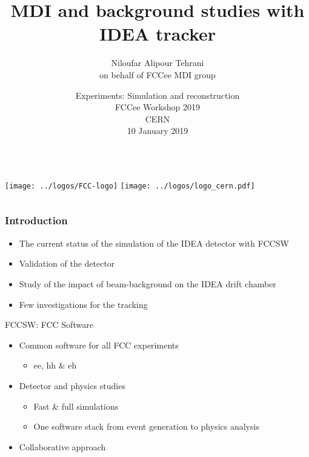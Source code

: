 \documentclass[aspectratio=169, hyperref={colorlinks=true,pdfpagelabels=false,linkcolor=black}, xcolor=dvipsnames,10pt]{beamer}
\title[]{MDI and background studies with IDEA tracker}
\author[Niloufar Alipour Tehrani]{Niloufar Alipour Tehrani \\
on behalf of FCCee MDI group}
\institute[CERN]{}
\date[10 April 2018]{Experiments: Simulation and reconstruction \\    \vspace{0.5cm}
  FCCee Workshop 2019 \\ CERN \\ \vspace{0.3cm}
  10 January 2019}
\renewcommand{\inserttotalframenumber}{\ref{lastframe}}
\begin{document}
\renewcommand{\inserttotalframenumber}{\pageref{lastslide}}



\begin{frame}[plain]

  \vspace{1cm}
  \titlepage

  \vspace{-1.5cm}
  \begin{columns}
    \centering
    \texttt{[image: ../logos/FCC-logo]}
    \centering
    \texttt{[image: ../logos/logo\_cern.pdf]}
  \end{columns}
\end{frame}



\begin{frame}
	\frametitle{Introduction}


  \begin{itemize}
  \item The current status of the simulation of the IDEA
    detector with FCCSW
  \item Validation of the detector
  \item Study of the impact of beam-background on the IDEA
    drift chamber
  \item Few investigations for the tracking
  \end{itemize}

    \begin{block}{FCCSW: FCC Software}
      \begin{itemize}
      \item Common software for all FCC experiments
        \begin{itemize}
        \item ee, hh \& eh
        \end{itemize}
      \item Detector and physics studies
        \begin{itemize}
        \item Fast \& full simulations
        \item One software stack from event generation to physics analysis
        \end{itemize}
      \item Collaborative approach
      \end{itemize}
    \end{block}

%


\end{frame}
\end{document}

